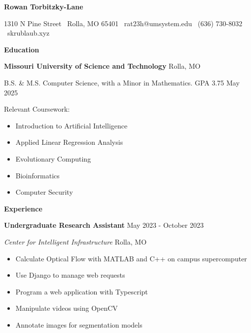 \documentclass[11pt]{article}
\begin{document}
\begin{center}
    \textbf{\huge Rowan Torbitzky-Lane}\\
    \hrulefill
\end{center}

\begin{center}
    1310 N Pine Street \textbullet \ Rolla, MO 65401 \textbullet \ rat23h@umsystem.edu \textbullet \ (636) 730-8032 \textbullet \ skrublaub.xyz
\end{center}


\begin{center}
    \textbf{Education}
\end{center}
\textbf{Missouri University of Science and Technology} \hfill Rolla, MO

B.S. \& M.S. Computer Science, with a Minor in Mathematics. GPA 3.75 \hfill May 2025

Relevant Coursework:
\begin{itemize}[noitemsep]
    \item Introduction to Artificial Intelligence
    \item Applied Linear Regression Analysis
    \item Evolutionary Computing
    \item Bioinformatics
    \item Computer Security
\end{itemize}


\begin{center}
    \textbf{Experience}
\end{center}

\textbf{Undergraduate Research Assistant} \hfill May 2023 - October 2023

\textsl{Center for Intelligent Infrastructure} \hfill Rolla, MO
\begin{itemize}[noitemsep]
    \item Calculate Optical Flow with MATLAB and C++ on campus supercomputer
    \item Use Django to manage web requests
    \item Program a web application with Typescript
    \item Manipulate videos using OpenCV
    \item Annotate images for segmentation models
\end{itemize}
\end{document}
